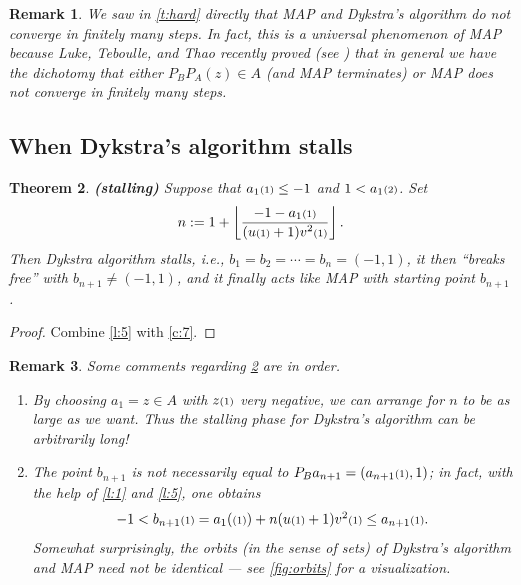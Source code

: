 \documentclass[12pt]{article}
\newtheorem{theorem}{Theorem}[section]
\newtheorem{remark}[theorem]{Remark}
\newcommand{\kkk}[1]{\ensuremath{\textstyle\mathsmaller{({#1})}}}
\newcommand{\eins}{\ensuremath{\textstyle\mathsmaller{({1})}}}
\newcommand{\zwei}{\ensuremath{\textstyle\mathsmaller{({2})}}}
\begin{document}
\begin{remark}
We saw in \cref{t:hard} directly that MAP and Dykstra's algorithm do 
not converge in finitely many steps.
In fact, this is a universal phenomenon of MAP because
Luke, Teboulle, and Thao recently proved (see \cite[Theorem~7]{Luke}) that
\emph{in general} we have the dichotomy that
either $P_BP_A(z)\in A$ (and MAP terminates) or 
MAP does not converge in finitely many steps. 
\end{remark}

\subsection*{When Dykstra's algorithm stalls}


\begin{theorem}{\rm\bf (stalling)}
\label{t:stall}
Suppose that 
$a_1\eins\leq-1$ and $1< a_1\zwei$. 
Set 
\begin{equation}
n := 1+ \left\lfloor \frac{\displaystyle -1-a_1\kkk{1}}{\displaystyle(u\kkk{1}+1)v^2\kkk{1}} \right\rfloor.
\end{equation}
Then Dykstra algorithm stalls, i.e.,  $b_1 = b_2 = \cdots = b_n = (-1,1)$,
it then ``breaks free'' with $b_{n+1}\neq (-1,1)$, and 
it finally acts like MAP with starting point $b_{n+1}$.
\end{theorem}
\begin{proof}
Combine \cref{l:5} with \cref{c:7}. 
\end{proof}

\begin{remark}
  \label{r:last}
  Some comments regarding \cref{t:stall} are in order.
\begin{enumerate}
  \item By choosing $a_1=z\in A$ with $z\eins$ very negative,
  we can arrange for $n$ to be as large as we want. 
  Thus the stalling phase for Dykstra's algorithm can be arbitrarily long!
  \item 
  \label{r:last2} 
  The point $b_{n+1}$ is not necessarily equal to $P_Ba_{n+1}=(a_{n+1}\eins,1)$;
  in fact, with the help of  \cref{l:1} and \cref{l:5}, one obtains
  \begin{equation}
   -1 <b_{n+1}\eins = a_1(\eins)+n(u\eins+1)v^2\eins\leq a_{n+1}\eins.
  \end{equation}
  Somewhat surprisingly, the orbits (in the sense of sets) of Dykstra's algorithm 
  and MAP need not be identical --- see \cref{fig:orbits} 
  for a visualization.
\end{enumerate}
\end{remark}
\end{document}
